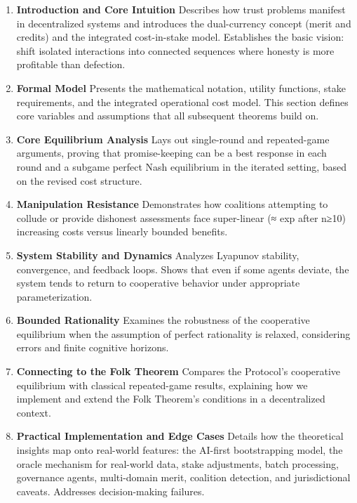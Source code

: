 \documentclass[11pt]{article}
\begin{document}
\begin{enumerate}
\item \textbf{Introduction and Core Intuition}
Describes how trust problems manifest in decentralized systems and introduces
the dual-currency concept (merit and credits) and the integrated cost-in-stake model. Establishes the basic vision:
shift isolated interactions into connected sequences where honesty is more profitable
than defection.

\item \textbf{Formal Model}
Presents the mathematical notation, utility functions, stake requirements, and
the integrated operational cost model. This section defines core variables and assumptions
that all subsequent theorems build on.

\item \textbf{Core Equilibrium Analysis}
Lays out single-round and repeated-game arguments, proving that promise-keeping
can be a best response in each round and a subgame perfect Nash equilibrium in the
iterated setting, based on the revised cost structure.

\item \textbf{Manipulation Resistance}
Demonstrates how coalitions attempting to collude or provide dishonest assessments
face super-linear (≈ exp after n≥10) increasing costs versus linearly bounded benefits.

\item \textbf{System Stability and Dynamics}
Analyzes Lyapunov stability, convergence, and feedback loops. Shows that even if
some agents deviate, the system tends to return to cooperative behavior under
appropriate parameterization.

\item \textbf{Bounded Rationality}
Examines the robustness of the cooperative equilibrium when the assumption of perfect rationality is relaxed, considering errors and finite cognitive horizons.

\item \textbf{Connecting to the Folk Theorem}
Compares the Protocol’s cooperative equilibrium with classical repeated-game
results, explaining how we implement and extend the Folk Theorem’s conditions
in a decentralized context.

\item \textbf{Practical Implementation and Edge Cases}
Details how the theoretical insights map onto real-world features: the AI-first
bootstrapping model, the oracle mechanism for real-world data, stake
adjustments, batch processing, governance agents, multi-domain merit, coalition
detection, and jurisdictional caveats. Addresses decision-making failures.


\end{enumerate}
\end{document}
